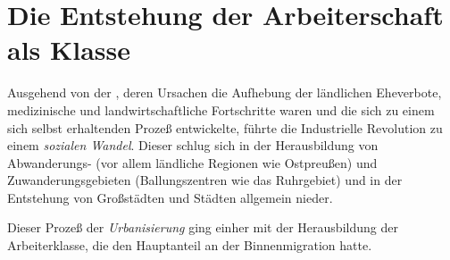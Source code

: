 \section{Die Entstehung der Arbeiterschaft als Klasse}
\label{sec:arb-klas-entst}

 Ausgehend
von der , deren Ursachen die
Aufhebung der ländlichen Eheverbote, medizinische und
landwirtschaftliche Fortschritte waren und die sich zu einem sich
selbst erhaltenden Prozeß entwickelte, führte die Industrielle
Revolution zu einem \emph{sozialen Wandel}. Dieser schlug sich in der
Herausbildung von Abwanderungs- (vor allem ländliche Regionen wie
Ostpreußen) und Zuwanderungsgebieten (Ballungszentren wie das
Ruhrgebiet) und in der Entstehung von Großstädten und Städten
allgemein nieder.

Dieser Prozeß der \emph{Urbanisierung} ging einher mit der
Herausbildung der Arbeiterklasse, die den Hauptanteil an der
Binnenmigration hatte.

\endinput

